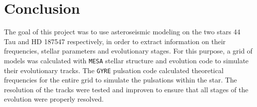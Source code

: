 \chapter{Conclusion}
\label{sec:conclusion}

The goal of this project was to use asteroseismic modeling on the two stars 44 Tau and HD 187547 respectively, in order to extract information on their frequencies, stellar parameters and evolutionary stages. For this purpose, a grid of models was calculated with \texttt{MESA} stellar structure and evolution code to simulate their evolutionary tracks. The \texttt{GYRE}  pulsation code calculated theoretical frequencies for the entire grid to simulate the pulsations within the star. The resolution of the tracks were tested and improven to ensure that all stages of the evolution were properly resolved. 

